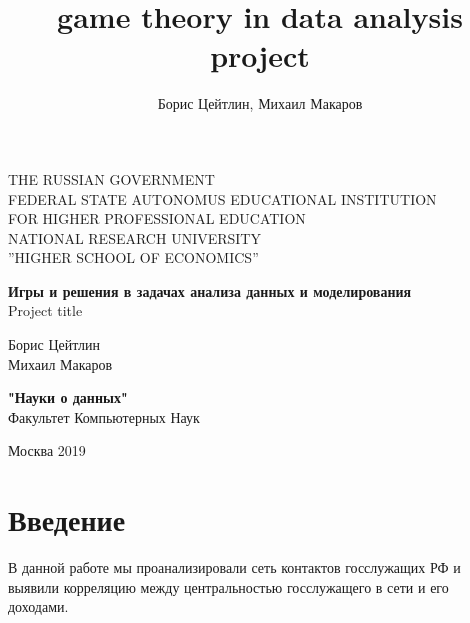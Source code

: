 \documentclass[a4paper,14pt]{article}
\author{Борис Цейтлин, Михаил Макаров}
\title{game theory in data analysis project}
\begin{document}
	\thispagestyle{empty}    %
	
	\begin{center}
		
		
		THE RUSSIAN GOVERNMENT \\
		FEDERAL STATE AUTONOMUS EDUCATIONAL INSTITUTION \\ FOR HIGHER PROFESSIONAL EDUCATION \\ NATIONAL RESEARCH UNIVERSITY \\ ''HIGHER SCHOOL OF ECONOMICS''
		
		\large
		\vspace{2 cm}
	\end{center}
	
	\vspace{2 cm}
	\begin{center}
		\vspace{1 cm} \textbf{Игры и решения в задачах анализа данных и моделирования} \\ \vspace{0.5 cm} Project title
		
	\end{center}
	
	\vspace{2 cm}
	
	\begin{flushright}
		{  Борис Цейтлин \\ Михаил Макаров}
		
		\vspace{1 cm}
		
		{ \textbf{"Науки о данных" } \\ Факультет Компьютерных Наук }
	\end{flushright}
	
	\begin{center}
		\vfill
		Москва 2019
	\end{center}
	
	\newpage
  \tableofcontents
  \newpage

	\section{Введение}
	
  В данной работе мы проанализировали сеть контактов госслужащих РФ и выявили  корреляцию между центральностью госслужащего в сети и его доходами.
\end{document}

